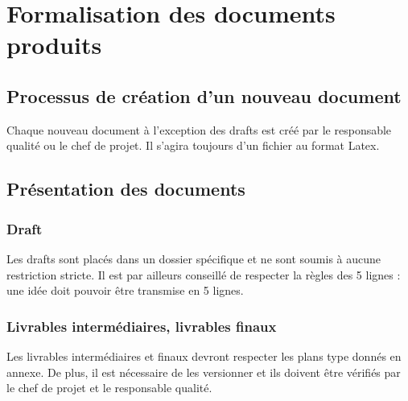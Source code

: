 \section{Formalisation des documents produits}
\subsection{Processus de création d'un nouveau document}
Chaque nouveau document à l'exception des drafts est créé par le responsable qualité ou le chef de projet. Il s'agira toujours d'un fichier au format Latex.
\subsection{Présentation des documents}
\subsubsection{Draft}
Les drafts sont placés dans un dossier spécifique et ne sont soumis à aucune restriction stricte. Il est par ailleurs conseillé de respecter la règles des 5 lignes : une idée doit pouvoir être transmise en 5 lignes.
\subsubsection{Livrables intermédiaires, livrables finaux}
Les livrables intermédiaires et finaux devront respecter les plans type donnés en annexe. De plus, il est nécessaire de les versionner et ils doivent être vérifiés par le chef de projet et le responsable qualité.
